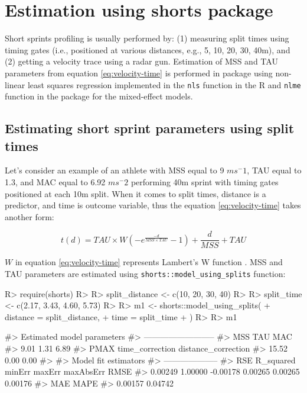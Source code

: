 \documentclass[
]{jss}
\begin{document}
\hypertarget{estimation-using-shorts-package}{%
\section{Estimation using shorts package}\label{estimation-using-shorts-package}}

Short sprints profiling is usually performed by: (1) measuring split times using timing gates (i.e., positioned at various distances, e.g., 5, 10, 20, 30, 40m), and (2) getting a velocity trace using a radar gun. Estimation of MSS and TAU parameters from equation \eqref{eq:velocity-time} is performed in  package using non-linear least squares regression implemented in the \texttt{nls} function in the  R \citep{R-base} and \texttt{nlme} function in the  package \citep{R-nlme} for the mixed-effect models.

\hypertarget{estimating-short-sprint-parameters-using-split-times}{%
\subsection{Estimating short sprint parameters using split times}\label{estimating-short-sprint-parameters-using-split-times}}

Let's consider an example of an athlete with MSS equal to 9 \(ms^-1\), TAU equal to 1.3, and MAC equal to 6.92 \(ms^-2\) performing 40m sprint with timing gates positioned at each 10m split. When it comes to split times, distance is a predictor, and time is outcome variable, thus the equation \eqref{eq:velocity-time} takes another form:

\begin{equation}
  t(d) = TAU \times W(-e^{\frac{-d}{MSS \times TAU}} - 1) + \frac{d}{MSS} + TAU \label{eq:time-distance}
\end{equation}

\(W\) in equation \eqref{eq:velocity-time} represents Lambert's W function \citep{R-LambertW}. MSS and TAU parameters are estimated using \texttt{shorts::model\_using\_splits} function:

\begin{CodeChunk}
\begin{CodeInput}
R> require(shorts)
R> 
R> split_distance <- c(10, 20, 30, 40)
R> 
R> split_time <- c(2.17, 3.43, 4.60, 5.73)
R> 
R> m1 <- shorts::model_using_splits(
+   distance = split_distance,
+   time = split_time
+ )
R> 
R> m1
\end{CodeInput}
\begin{CodeOutput}
#> Estimated model parameters
#> --------------------------
#>                 MSS                 TAU                 MAC 
#>                9.01                1.31                6.89 
#>                PMAX     time_correction distance_correction 
#>               15.52                0.00                0.00 
#> 
#> Model fit estimators
#> --------------------
#>       RSE R_squared    minErr    maxErr maxAbsErr      RMSE 
#>   0.00249   1.00000  -0.00178   0.00265   0.00265   0.00176 
#>       MAE      MAPE 
#>   0.00157   0.04742
\end{CodeOutput}
\end{CodeChunk}
\end{document}
